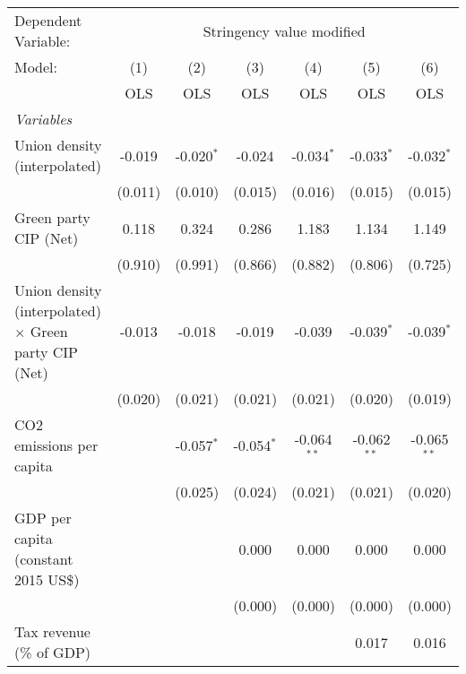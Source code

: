 
\begingroup
\centering
\begin{tabular}{lcccccc}
   \toprule
   Dependent Variable: & \multicolumn{6}{c}{Stringency value modified}\\
   Model:                                                       & (1)     & (2)          & (3)          & (4)           & (5)           & (6)\\  
                                                                &  OLS    & OLS          & OLS          & OLS           & OLS           & OLS\\  
   \midrule
   \emph{Variables}\\
   Union density (interpolated)                                 & -0.019  & -0.020$^{*}$ & -0.024       & -0.034$^{*}$  & -0.033$^{*}$  & -0.032$^{*}$\\   
                                                                & (0.011) & (0.010)      & (0.015)      & (0.016)       & (0.015)       & (0.015)\\   
   Green party CIP (Net)                                        & 0.118   & 0.324        & 0.286        & 1.183         & 1.134         & 1.149\\   
                                                                & (0.910) & (0.991)      & (0.866)      & (0.882)       & (0.806)       & (0.725)\\   
   Union density (interpolated) $\times$ Green party CIP (Net)  & -0.013  & -0.018       & -0.019       & -0.039        & -0.039$^{*}$  & -0.039$^{*}$\\   
                                                                & (0.020) & (0.021)      & (0.021)      & (0.021)       & (0.020)       & (0.019)\\   
   CO2 emissions per capita                                     &         & -0.057$^{*}$ & -0.054$^{*}$ & -0.064$^{**}$ & -0.062$^{**}$ & -0.065$^{**}$\\   
                                                                &         & (0.025)      & (0.024)      & (0.021)       & (0.021)       & (0.020)\\   
   GDP per capita (constant 2015 US\$)                          &         &              & 0.000        & 0.000         & 0.000         & 0.000\\   
                                                                &         &              & (0.000)      & (0.000)       & (0.000)       & (0.000)\\   
   Tax revenue (\% of GDP)                                      &         &              &              &               & 0.017         & 0.016\\   

\end{tabular}

